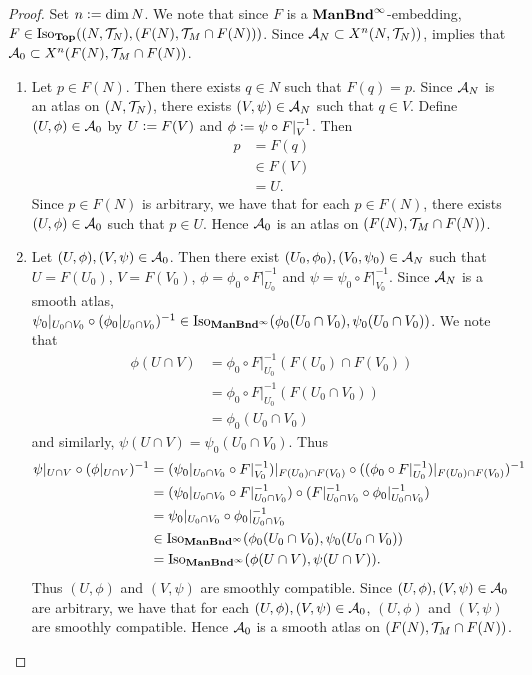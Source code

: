 \documentclass{book}
\begin{document}
	\begin{proof}
		Set $n \vcentcolon= \dim N$. We note that since $F$ is a $\operatorname*{\text{\textbf{ManBnd}}^{\infty}}$-embedding, $F \in \operatorname{Iso}_{\operatorname*{\text{\textbf{Top}}}}((N, \mathcal{T}_N), (F(N), \mathcal{T}_M \cap F(N)))$. Since $\mathcal{A}_N \subset X^n(N, \mathcal{T}_N))$,  implies that $\mathcal{A}_0 \subset X^n(F(N), \mathcal{T}_M \cap F(N))$.
		\begin{enumerate}
			\item Let $p \in F(N)$. Then there exists $q \in N$ such that $F(q) = p$. Since $\mathcal{A}_N$ is an atlas on $(N, \mathcal{T}_N)$, there exists $(V, \psi) \in \mathcal{A}_N$ such that $q \in V$. Define $(U, \phi) \in \mathcal{A}_0$ by $U \vcentcolon= F(V)$ and $\phi \vcentcolon= \psi \circ F|_V^{-1}$. Then 
			\begin{align*}
				p
				& = F(q) \\
				& \in F(V) \\
				& = U.
			\end{align*}
			Since $p \in F(N)$ is arbitrary, we have that for each $p \in F(N)$, there exists $(U, \phi) \in \mathcal{A}_0$ such that $p \in U$. Hence $\mathcal{A}_0$ is an atlas on $(F(N), \mathcal{T}_M \cap F(N))$.
			\item Let $(U, \phi), (V, \psi) \in \mathcal{A}_0$. Then there exist $(U_0, \phi_0), (V_0, \psi_0) \in \mathcal{A}_N$ such that $U = F(U_0)$, $V = F(V_0)$, $\phi = \phi_0 \circ F|_{U_0}^{-1}$ and $\psi = \psi_0 \circ F|_{V_0}^{-1}$. Since $\mathcal{A}_N$ is a smooth atlas, $\psi_0|_{U_0 \cap V_0} \circ (\phi_0|_{U_0 \cap V_0})^{-1} \in \operatorname{Iso}_{\operatorname*{\text{\textbf{ManBnd}}^{\infty}}}(\phi_0(U_0 \cap V_0), \psi_0(U_0 \cap V_0))$. We note that  
			\begin{align*}
				\phi(U \cap V) 
				& = \phi_0 \circ F|_{U_0}^{-1}(F(U_0) \cap F(V_0)) \\
				& = \phi_0 \circ F|_{U_0}^{-1}(F(U_0 \cap V_0)) \\
				& = \phi_0(U_0 \cap V_0)
			\end{align*}
			and similarly, $\psi(U \cap V) = \psi_0(U_0 \cap V_0)$. Thus 
			\begin{align*}
				\psi|_{U \cap V} \circ (\phi|_{U \cap V})^{-1}
				& = (\psi_0|_{U_0 \cap V_0} \circ F|_{V_0}^{-1})|_{F(U_0) \cap F(V_0)} \circ ((\phi_0 \circ F|_{U_0}^{-1})|_{F(U_0) \cap F(V_0)})^{-1} \\
				& = (\psi_0|_{U_0 \cap V_0} \circ F|_{U_0 \cap V_0}^{-1}) \circ (F|_{U_0 \cap V_0}^{-1} \circ \phi_0|_{U_0 \cap V_0}^{-1}) \\
				& = \psi_0|_{U_0 \cap V_0} \circ \phi_0|_{U_0 \cap V_0}^{-1} \\
				& \in \operatorname{Iso}_{\operatorname*{\text{\textbf{ManBnd}}^{\infty}}}(\phi_0(U_0 \cap V_0), \psi_0(U_0 \cap V_0)) \\
				& = \operatorname{Iso}_{\operatorname*{\text{\textbf{ManBnd}}^{\infty}}}(\phi(U \cap V), \psi(U \cap V)).
			\end{align*}
			Thus $(U, \phi)$ and $(V, \psi)$ are smoothly compatible. Since $(U, \phi), (V, \psi) \in \mathcal{A}_0$ are arbitrary, we have that for each $(U, \phi), (V, \psi) \in \mathcal{A}_0$, $(U, \phi)$ and $(V, \psi)$ are smoothly compatible. Hence $\mathcal{A}_0$ is a smooth atlas on $(F(N), \mathcal{T}_M \cap F(N))$.
		\end{enumerate}
	\end{proof}
\end{document}
